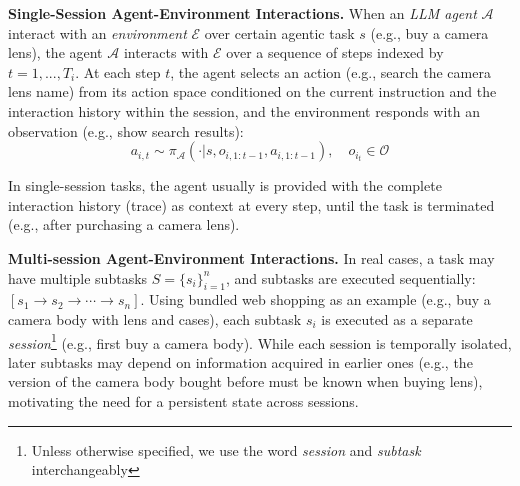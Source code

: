 \textbf{Single-Session Agent-Environment Interactions.} 
When an \textit{LLM agent} $\mathcal{A}$ interact with an \textit{environment} $\mathcal{E}$ over certain agentic task $s$ (e.g., buy a camera lens),  the agent $\mathcal{A}$ interacts with $\mathcal{E}$ over a sequence of steps indexed by $t=1, ..., T_i$. At each step $t$, the agent selects an action (e.g., search the camera lens name) from its action space conditioned on the current instruction and the interaction history within the session, and the environment responds with an observation (e.g., show search results):
\begin{equation}
    a_{i,t} \sim  \pi_{\mathcal{A}}(\cdot | s, o_{i, 1:t-1}, a_{i, 1:t-1}), \quad o_{i_t} \in \mathcal{O}
\end{equation}

In single-session tasks, the agent usually is provided with the complete interaction history (trace) as context at every step, until the task is terminated (e.g., after purchasing a camera lens).



\textbf{Multi-session Agent-Environment Interactions.}
In real cases, a task may have multiple subtasks $S = \{s_i\}_{i=1}^n$, and subtasks are executed sequentially:
$[s_1 \rightarrow s_2 \rightarrow \cdots \rightarrow s_n]$.
Using bundled web shopping as an example (e.g., buy a camera body with lens and cases), each subtask $s_i$ is executed as a separate \textit{session}\footnote{Unless otherwise specified, we use the word \textit{session} and \textit{subtask} interchangeably} (e.g., first buy a camera body).
 While each session is temporally isolated, later subtasks may depend on information acquired in earlier ones (e.g., the version of the camera body bought before must be known when buying lens), motivating the need for a persistent state across sessions.

